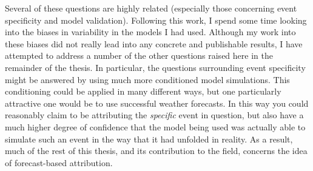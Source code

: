   Several of these questions are highly related (especially those concerning event specificity and model validation). Following this work, I spend some time looking into the biases in variability in the models I had used. Although my work into these biases did not really lead into any concrete and publishable results, I have attempted to address a number of the other questions raised here in the remainder of the thesis. In particular, the questions surrounding event specificity might be answered by using much more conditioned model simulations. This conditioning could be applied in many different ways, but one particularly attractive one would be to use successful weather forecasts. In this way you could reasonably claim to be attributing the \emph{specific} event in question, but also have a much higher degree of confidence that the model being used was actually able to simulate such an event in the way that it had unfolded in reality. As a result, much of the rest of this thesis, and its contribution to the field, concerns the idea of forecast-based attribution.